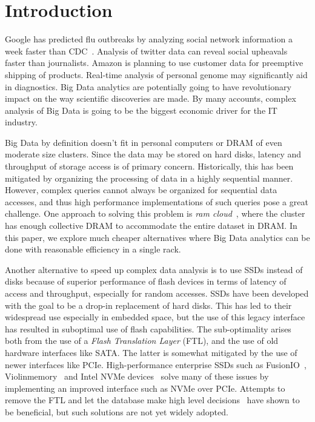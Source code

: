 \section{Introduction}
\label{sec:intro}

Google has predicted flu outbreaks by analyzing social network information a
week faster than CDC~\cite{googleflu}. Analysis of twitter data can reveal social
upheavals faster than journalists. Amazon is planning to use customer data for
preemptive shipping of products. Real-time analysis of personal genome may
significantly aid in diagnostics. Big Data analytics are potentially going to
have revolutionary impact on the way scientific discoveries are made. By many
accounts, complex analysis of Big Data is going to be the biggest economic
driver for the IT industry.

Big Data by definition doesn’t fit in personal computers or DRAM of even
moderate size clusters. Since the data may be stored on hard disks, latency and
throughput of storage access is of primary concern. Historically, this has been
mitigated by organizing the processing of data in a highly sequential manner.
However, complex queries cannot always be organized for sequential data
accesses, and thus high performance implementations of such queries pose a
great challenge. One approach to solving this problem is \emph{ram
cloud}~\cite{ramcloud}, where the cluster has enough collective DRAM to accommodate the
entire dataset in DRAM. In this paper, we explore much cheaper alternatives
where Big Data analytics can be done with reasonable efficiency in a single
rack.

Another alternative to speed up complex data analysis is to use SSDs instead of
disks because of superior performance of flash devices in terms of latency of
access and throughput, especially for random accesses. SSDs have been developed
with the goal to be a drop-in replacement of hard disks. This has led to their
widespread use especially in embedded space, but the use of this legacy
interface has resulted in suboptimal use of flash capabilities. The
sub-optimality arises both from the use of a \emph{Flash Translation Layer}
(FTL), and the use of old hardware interfaces like SATA. The latter is somewhat
mitigated by the use of newer interfaces like PCIe.  High-performance enterprise
SSDs such as FusionIO~\cite{fusionio}, Violinmemory~\cite{violinmemory} and Intel NVMe
devices~\cite{intelnvme} solve many of these issues by implementing an improved interface
such as NVMe over PCIe. Attempts to remove the FTL and let the database make
high level decisions~\cite{noftl} have shown to be beneficial, but such
solutions are not yet widely adopted.


